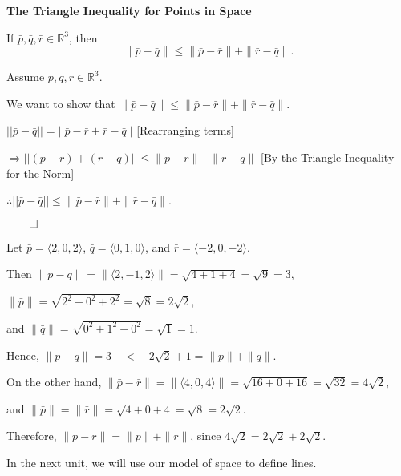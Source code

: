 \begin{theorembox}
\textbf{The Triangle Inequality for Points in Space}

If $\bar{p}, \bar{q}, \bar{r} \in \mathbb{R}^3$, then
\[
\|\bar{p} - \bar{q}\| \leq \|\bar{p} - \bar{r}\| + \|\bar{r} - \bar{q}\|.
\]
\end{theorembox}

\begin{proofbox}
Assume $\bar{p}, \bar{q}, \bar{r} \in \mathbb{R}^3$.

We want to show that $\|\bar{p} - \bar{q}\| \leq \|\bar{p} - \bar{r}\| + \|\bar{r} - \bar{q}\|$.

\quad $||\bar{p} - \bar{q}|| = ||\bar{p} - \bar{r} + \bar{r} - \bar{q}||$ \hfill [Rearranging terms]

\quad $\Rightarrow ||(\bar{p} - \bar{r}) + (\bar{r} - \bar{q})|| \leq \|\bar{p} - \bar{r}\| + \|\bar{r} - \bar{q}\|$ \hfill [By the Triangle Inequality for the Norm]

\quad $\therefore ||\bar{p} - \bar{q}|| \leq \|\bar{p} - \bar{r}\| + \|\bar{r} - \bar{q}\|$.

\hfill $\qed$

\end{proofbox}

\begin{examplebox}
Let $\bar{p} = \langle 2, 0, 2 \rangle$, \quad
$\bar{q} = \langle 0, 1, 0 \rangle$, \quad
and $\bar{r} = \langle -2, 0, -2 \rangle$.

\vspace{1em}

Then $\|\bar{p} - \bar{q}\| = \|\langle 2, -1, 2 \rangle\| = \sqrt{4 + 1 + 4} = \sqrt{9} = 3$,

\quad $\|\bar{p}\| = \sqrt{2^2 + 0^2 + 2^2} = \sqrt{8} = 2\sqrt{2}$,

\quad and $\|\bar{q}\| = \sqrt{0^2 + 1^2 + 0^2} = \sqrt{1} = 1$.

\vspace{1em}


Hence, $\|\bar{p} - \bar{q}\| = 3 \quad < \quad 2\sqrt{2} + 1 = \|\bar{p}\| + \|\bar{q}\|$.

\vspace{1em}

On the other hand, $\|\bar{p} - \bar{r}\| = \|\langle 4, 0, 4 \rangle\| = \sqrt{16 + 0 + 16} = \sqrt{32} = 4\sqrt{2}$,  

\quad and $\|\bar{p}\| = \|\bar{r}\| = \sqrt{4 + 0 + 4} = \sqrt{8} = 2\sqrt{2}$.

\vspace{1em}

Therefore, $\|\bar{p} - \bar{r}\| = \|\bar{p}\| + \|\bar{r}\|$,  
\quad since $4\sqrt{2} = 2\sqrt{2} + 2\sqrt{2}$.

\end{examplebox}



In the next unit, we will use our model of space to define lines.

\newpage
